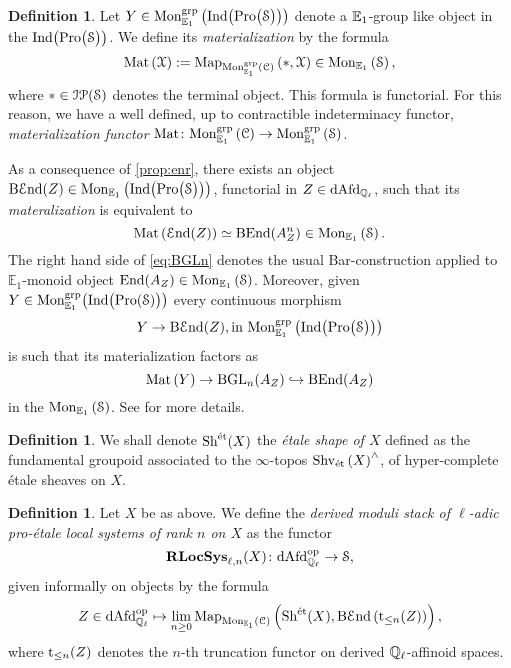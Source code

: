 \documentclass[10pt,a4paper]{amsart}
\numberwithin{equation}{subsection}
\theoremstyle{plain}
\theoremstyle{definition}
\newtheorem{defi}[theorem]{Definition}
\theoremstyle{remark}
\numberwithin{equation}{section}
\begin{document}
\begin{defi}
Let $Y \in \mathrm{Mon}_{\mathbb E_1}^{\mathrm{grp}} \left( \mathrm{Ind} \big( \mathrm{Pro} \big( \mathcal S \big) \big) \right)$ denote a $\mathbb E_1$-group like object in the \infcat $\mathrm{Ind} \big( \mathrm{Pro} \big( \mathcal S \big) \big)$. We define its \emph{materialization} by the formula
	\[
		\mathrm{Mat} \left(\mathcal X \right) := \mathrm{Map}_{\mathrm{Mon}^{\mathrm{grp}}_{\mathbb E_1} \left( \mathcal{C} \right) } \left( *, \mathcal X \right) \in \mathrm{Mon}_{\mathbb E_1} \left( \mathcal S \right),
	\]
where $* \in \mathcal{I} \mathcal{P}(\mathcal S)$ denotes the terminal object.
This formula is functorial. For this reason, we have a well defined, up to contractible indeterminacy functor, \emph{materialization functor} $\mathrm{Mat} \colon \mathrm{Mon}_{\mathbb E_1}^{\mathrm{grp}} \left( \mathcal C \right) \to \mathrm{Mon}_{\mathbb E_1}^{\mathrm{grp}} \left( \mathcal S \right)$.
\end{defi}

As a consequence of \cref{prop:enr}, there exists an object $\mathrm{B} \mathcal E \mathrm{nd}  (Z) \in \mathrm{Mon}_{\mathbb E_1} \left( \mathrm{Ind} \big( \mathrm{Pro} \big( \mathcal S \big) \big) \right)$, functorial in $ Z \in \mathrm{dAfd}_{\mathbb{Q}_\ell}$, such that its \emph{materalization} is equivalent to
	\begin{equation} \label{eq:BGLn}
		\mathrm{Mat} \left( \mathcal E \mathrm{nd} (Z)  \right)  \simeq \mathrm  {\mathrm{B}} \mathrm{End}(A^n_Z) \in \mathrm{Mon}_{\mathbb E_1} \left( \mathcal S \right).
	\end{equation}
The right hand side of \eqref{eq:BGLn} denotes the usual Bar-construction applied to $\mathbb E_1$-monoid object $\mathrm{End}(A_Z)  \in \mathrm{Mon}_{\mathbb E_1} \left( \mathcal S \right)$. Moreover, given $Y \in \mathrm{Mon}^{\mathrm{grp}}_{\mathbb E_1} \big( \mathrm{Ind} \big( \mathrm{Pro} (\mathcal S ) \big) \big)$
every continuous morphism
	\[
		 Y \to \mathrm{B} \mathcal E \mathrm{nd} (Z), \text{in } \mathrm{Mon}_{\mathbb E_1}^{\mathrm{grp}} \left( \mathrm{Ind} \big( \mathrm{Pro} \big( \mathcal S \big) \big) \right)
	\]
is such that its materialization factors as
	\[
		\mathrm{Mat} \left( Y \right) \to \mathrm{B} \mathrm{GL}_n(A_Z) \hookrightarrow \mathrm{B} \mathrm{End}(A_Z)
	\]
in the \infcat  $ \mathrm{Mon}_{\mathbb E_1} \left( \mathcal S \right)$.
See \cite[\S 4.3 and ]{me1} for more details.


\begin{defi}{\cite[Notation 3.6.1]{lurieDAGXIII}}
We shall denote $\mathrm{Sh}^{\text{\'et}}(X)$ the \emph{\'etale shape of $X$} defined as the fundamental groupoid associated to the $\infty$-topos $\mathrm{Shv}_{\text{\'et}} \left( X \right)^\wedge$, of hyper-complete \'etale sheaves on $X$.
\end{defi}


\begin{defi}
Let $X$ be as above. We define the \emph{derived moduli stack of $\ell$-adic pro-\'etale local systems of rank $n$ on $X$} as the functor
	\[
		\mathbf R \mathbf{LocSys}_{\ell, n}(X) \colon \mathrm{dAfd}_{\mathbb{Q}_\ell}^{\mathrm{op}} \to \mathcal S, 
	\]
given informally on objects by the formula 
	\[
		 Z \in  \mathrm{dAfd}_{\mathbb{Q}_\ell}^{\mathrm{op}} \mapsto \lim_{n \geq 0 } \mathrm{Map}_{\mathrm{Mon}_{\mathbb E_1}(\mathcal{C})} \left( \mathrm{Sh}^{\text{\'et}}(X), \mathrm{B}  \mathcal E \mathrm{nd} \left( \mathrm{t}_{\leq n} (Z)  \right)  \right),
	\]
where $\mathrm{t}_{\leq n} (Z)$ denotes the $n$-th truncation functor on derived $\mathbb{Q}_\ell$-affinoid spaces.
\end{defi}
\end{document}
